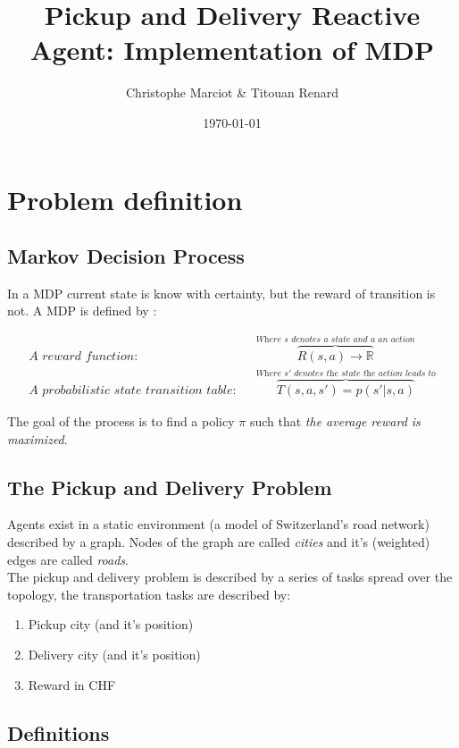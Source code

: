 \documentclass[11pt]{article}
\title{Pickup and Delivery Reactive Agent: Implementation of MDP}
\date{\today}
\author{Christophe Marciot \& Titouan Renard}
\begin{document}
\maketitle	

\section{Problem definition}

\subsection{Markov Decision Process}

In a MDP current state is know with certainty, but the reward of transition is not. A MDP is defined by : 

\begin{align*}
    \textit{A reward function:} && \overbrace{R(s,a) \rightarrow \mathbb{R}}^{\textit{Where $s$ denotes a state and $a$ an action}} \\
    \textit{A probabilistic state transition table:} && \overbrace{T(s,a,s') = p(s'|s,a)}^{\textit{Where $s'$ denotes the state the action leads to}}
\end{align*}

The goal of the process is to find a policy $\pi$ such that \textit{the average reward is maximized}.

\subsection{The Pickup and Delivery Problem}

Agents exist in a static environment (a model of Switzerland's road network) described by a graph. Nodes of the graph are called \textit{cities} and it's (weighted) edges are called \textit{roads}. \\

The pickup and delivery problem is described by a series of tasks spread over the topology, the transportation tasks are described by: 

\begin{enumerate}
    \item Pickup city (and it's position)
    \item Delivery city (and it's position)
    \item Reward in CHF
\end{enumerate}

\newpage

\subsection{Definitions}
\end{document}

